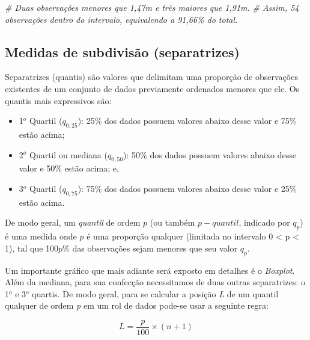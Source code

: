 \documentclass[
]{book}
\newenvironment{Shaded}{\begin{snugshade}}{\end{snugshade}}
\newcommand{\CommentTok}[1]{\textcolor[rgb]{0.56,0.35,0.01}{\textit{#1}}}
\providecommand{\tightlist}{%
  \setlength{\itemsep}{0pt}\setlength{\parskip}{0pt}}
\begin{document}
\begin{Shaded}
\begin{Highlighting}[]
\CommentTok{\# Duas observações menores que 1,47m e trẽs maiores que 1,91m.}
\CommentTok{\# Assim, 54 observações dentro do intervalo, equivalendo a 91,66\% do total.}
\end{Highlighting}
\end{Shaded}

\hypertarget{medidas-de-subdivisuxe3o-separatrizes}{%
\subsection{Medidas de subdivisão (separatrizes)}\label{medidas-de-subdivisuxe3o-separatrizes}}

\hfill\break

Separatrizes (quantis) são valores que delimitam uma proporção de observações existentes de um conjunto de dados previamente ordenados menores que ele. Os quantis mais expressivos são:

\hfill\break

\begin{itemize}
\tightlist
\item
  1\(^{o}\) Quartil (\(q_{0,25}\)): 25\% dos dados possuem valores abaixo desse valor e 75\% estão acima;
\item
  2\(^{o}\) Quartil ou mediana (\(q_{0,50}\)): 50\% dos dados possuem valores abaixo desse valor e 50\% estão acima; e,
\item
  3\(^{o}\) Quartil (\(q_{0,75}\)): 75\% dos dados possuem valores abaixo desse valor e 25\% estão acima.
\end{itemize}

\hfill\break

De modo geral, um \emph{quantil} de ordem \(p\) (ou também \(p-quantil\), indicado por \(q_{p}\)) é uma medida onde \(p\) é uma proporção qualquer (limitada no intervalo 0 \textless{} p \textless{} 1), tal que 100\(p\)\% das observações sejam menores que seu valor \(q_{p}\).

\hfill\break

Um importante gráfico que mais adiante será exposto em detalhes é o \emph{Boxplot}. Além da mediana, para sua confecção necessitamos de duas outras separatrizes: o 1\(^{o}\) e 3\(^{o}\) quartis. De modo geral, para se calcular a posição \emph{L} de um quantil qualquer de ordem \emph{p} em um rol de dados pode-se usar a seguinte regra:

\[
L=\frac{p}{100} \times (n+1)
\]\\
\end{document}
